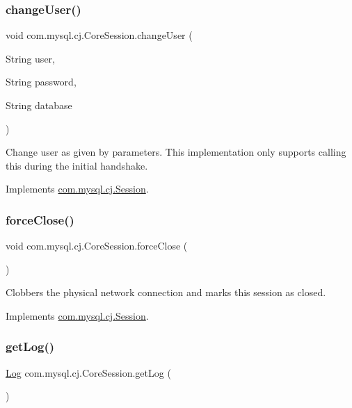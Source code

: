 \subsubsection{\texorpdfstring{change\+User()}{changeUser()}}
{\footnotesize\ttfamily void com.\+mysql.\+cj.\+Core\+Session.\+change\+User (\begin{DoxyParamCaption}\item[{String}]{user,  }\item[{String}]{password,  }\item[{String}]{database }\end{DoxyParamCaption})}

Change user as given by parameters. This implementation only supports calling this during the initial handshake. 

Implements \mbox{\hyperlink{interfacecom_1_1mysql_1_1cj_1_1_session_ae89407fa6e67fd4537f06c85f0a2695b}{com.\+mysql.\+cj.\+Session}}.

\mbox{\label{classcom_1_1mysql_1_1cj_1_1_core_session_a9a0da3cad1f23cae2481b9e8788e4bff}} 
\subsubsection{\texorpdfstring{force\+Close()}{forceClose()}}
{\footnotesize\ttfamily void com.\+mysql.\+cj.\+Core\+Session.\+force\+Close (\begin{DoxyParamCaption}{ }\end{DoxyParamCaption})}

Clobbers the physical network connection and marks this session as closed. 

Implements \mbox{\hyperlink{interfacecom_1_1mysql_1_1cj_1_1_session_a4394068e5b6e4534ae8d2d90ea4be2c6}{com.\+mysql.\+cj.\+Session}}.

\mbox{\label{classcom_1_1mysql_1_1cj_1_1_core_session_ae6ee08b5d613e57d0f9e16f037ecb6cf}} 
\subsubsection{\texorpdfstring{get\+Log()}{getLog()}}
{\footnotesize\ttfamily \mbox{\hyperlink{interfacecom_1_1mysql_1_1cj_1_1log_1_1_log}{Log}} com.\+mysql.\+cj.\+Core\+Session.\+get\+Log (\begin{DoxyParamCaption}{ }\end{DoxyParamCaption})}

